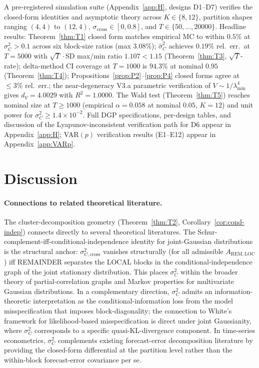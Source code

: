 \documentclass[11pt,letterpaper]{article}
\theoremstyle{remark}
\newcommand{\REM}{\mathrm{REM}}
\newcommand{\LOC}{\mathrm{LOC}}
\begin{document}
A pre-registered simulation suite (Appendix~\ref{app:H}, designs D1--D7) verifies the closed-form identities and asymptotic theory across $K \in \{8, 12\}$, partition shapes ranging $(4, 4)$ to $(12, 4)$, $\sigma_{\mathrm{cross}} \in [0, 0.8]$, and $T \in \{50, \ldots, 20000\}$. Headline results: Theorem~\ref{thm:T1} closed form matches empirical MC to within $0.5\%$ at $\sigma^2_C > 0.1$ across six block-size ratios (max $3.08\%$); $\widehat{\sigma}^2_C$ achieves $0.19\%$ rel.\ err.\ at $T = 5000$ with $\sqrt{T}\cdot\mathrm{SD}$ max/min ratio $1.107 < 1.15$ (Theorem~\ref{thm:T3}, $\sqrt{T}$-rate); delta-method CI coverage at $T = 1000$ is $94.3\%$ at nominal $0.95$ (Theorem~\ref{thm:T4}); Propositions~\ref{prop:P2}--\ref{prop:P4} closed forms agree at $\le 3\%$ rel.\ err.; the near-degeneracy V3.a parametric verification of $V \sim 1/\lambda_{\min}^4$ gives $d_V = 4.0029$ with $R^2 = 1.0000$. The Wald test (Theorem~\ref{thm:T5}) reaches nominal size at $T \ge 1000$ (empirical $\alpha = 0.058$ at nominal $0.05$, $K = 12$) and unit power for $\sigma^2_C \ge 1.4 \times 10^{-2}$. Full DGP specifications, per-design tables, and discussion of the Lyapunov-inconsistent verification path for D6 appear in Appendix~\ref{app:H}; VAR$(p)$ verification results (E1--E12) appear in Appendix~\ref{app:VARp}.

\section{Discussion}\label{sec:disc}

\paragraph{Connections to related theoretical literature.} The cluster-decomposition geometry (Theorem~\ref{thm:T2}, Corollary~\ref{cor:cond-indep}) connects directly to several theoretical literatures. The Schur-complement-iff-conditional-independence identity for joint-Gaussian distributions \cite{Lauritzen1996} is the structural anchor: $\sigma^2_{C, \mathrm{cross}}$ vanishes structurally (for all admissible $A_{\REM, \LOC}$) iff REMAINDER separates the LOCAL blocks in the conditional-independence graph of the joint stationary distribution. This places $\sigma^2_C$ within the broader theory of partial-correlation graphs and Markov properties for multivariate Gaussian distributions. In a complementary direction, $\sigma^2_C$ admits an information-theoretic interpretation as the conditional-information loss from the model misspecification that imposes block-diagonality; the connection to White's framework \cite{White1982} for likelihood-based misspecification is direct under joint Gaussianity, where $\sigma^2_C$ corresponds to a specific quasi-KL-divergence component. In time-series econometrics, $\sigma^2_C$ complements existing forecast-error decomposition literature \cite[Ch.~2.2.2, Ch.~3.5]{Lutkepohl2005} by providing the closed-form differential at the partition level rather than the within-block forecast-error covariance per se.
\end{document}
